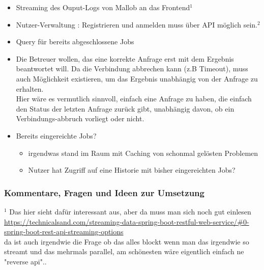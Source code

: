 \begin{itemize}
    \item Streaming des Ouput-Logs von Mallob an das Frontend$^1$
    \item Nutzer-Verwaltung :  Registrieren und anmelden muss über API möglich sein.$^2$

    \item Query für bereits abgeschlossene Jobs

    \item Die Betreuer wollen, das eine korrekte Anfrage erst mit dem Ergebnis beantwortet will. Da die Verbindung abbrechen kann (z.B Timeout), muss auch Möglichkeit existieren, um das Ergebnis unabhängig von der Anfrage zu erhalten.\\
    Hier wäre es vermutlich sinnvoll, einfach eine Anfrage zu haben, die einfach den Status der letzten Anfrage zurück gibt, unabhängig davon, ob ein Verbindungs-abbruch vorliegt oder nicht.

    
    
    \item Bereits eingereichte Jobs?
    \begin{itemize}
        \item irgendwas stand im Raum mit Caching von schonmal gelösten Problemen
        \item Nutzer hat Zugriff auf eine Historie mit bisher eingereichten Jobs?
    \end{itemize}


\end{itemize}

\subsubsection{Kommentare, Fragen und Ideen zur Umsetzung}

$^1$ Das hier sieht dafür interessant aus, aber da muss man sich noch gut einlesen \\
\url{https://technicalsand.com/streaming-data-spring-boot-restful-web-service/#0-spring-boot-rest-api-streaming-options} \\da ist auch irgendwie die Frage ob das alles blockt wenn man das irgendwie so streamt und das mehrmals parallel, am schönesten wäre eigentlich einfach ne "reverse api"..\\


